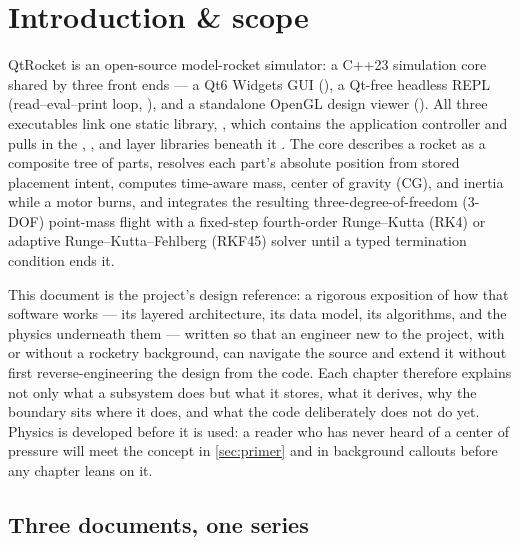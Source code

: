 \section{Introduction \& scope}\label{sec:intro}

QtRocket is an open-source model-rocket simulator: a C++23 simulation core shared by three
front ends --- a Qt6 Widgets GUI (), a Qt-free headless REPL
(read--eval--print loop, ), and a standalone OpenGL design viewer
(). All three executables link one static library,
, which contains the application controller and pulls in the
, , and  layer libraries beneath it
. The core describes a rocket as a composite tree of parts,
resolves each part's absolute position from stored placement intent, computes time-aware
mass, center of gravity (CG), and inertia while a motor burns, and integrates the resulting
three-degree-of-freedom (3-DOF) point-mass flight with a fixed-step fourth-order
Runge--Kutta (RK4) or adaptive Runge--Kutta--Fehlberg (RKF45) solver until a typed
termination condition ends it.

This document is the project's design reference: a rigorous exposition of how that software
works --- its layered architecture, its data model, its algorithms, and the physics
underneath them --- written so that an engineer new to the project, with or without a
rocketry background, can navigate the source and extend it without first reverse-engineering
the design from the code. Each chapter therefore explains not only what a subsystem does but
what it stores, what it derives, why the boundary sits where it does, and what the code
deliberately does not do yet. Physics is developed before it is used: a reader who has never
heard of a center of pressure will meet the concept in \cref{sec:primer} and in background
callouts before any chapter leans on it.

\subsection{Three documents, one series}\label{sec:intro-series}

